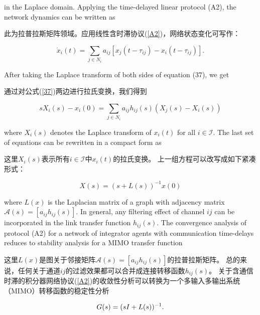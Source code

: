 \documentclass{article}
\begin{document}
{\color[gray]{0.5}
\noindent in the Laplace domain. 
Applying the time-delayed linear protocol (A2), the network dynamics can be written as
}

\noindent 此为拉普拉斯矩阵领域。应用线性含时滞协议(\ref{A2})，网络状态变化可写作：

\begin{equation}
    \dot{x}_i(t) = \sum_{j\in N_i} a_{ij} [x_j(t-\tau_{ij}) - x_i(t-\tau_{ij})].
    \tag{37}
    \label{37}
\end{equation}

{\color[gray]{0.5}
\noindent After taking the Laplace transform of both sides of equation (37), we get 
}

\noindent 通过对公式(\ref{37})两边进行拉氏变换，我们得到

\begin{equation}
    sX_i(s) - x_i(0) = \sum_{j\in N_i} a_{ij} h_{ij}(s) (X_j(s) - X_i(s))
    \tag{38}
    \label{38}
\end{equation}

{\color[gray]{0.5}
\noindent where $X_i(s)$ denotes the Laplace transform of $x_i(t)$ for all $i\in \mathcal{I}$. 
The last set of equations can be rewritten in a compact form as
}

\noindent 这里$X_i(s)$表示所有$i\in \mathcal{I}$中$x_i(t)$的拉氏变换。
上一组方程可以改写成如下紧凑形式：

\begin{equation}
    X(s) = (s+L(s))^{-1}x(0)
    \tag{39}
    \label{39}
\end{equation}

{\color[gray]{0.5}
\noindent where $L(x)$ is the Laplacian matrix of a graph with adjacency matrix $\mathcal{A}(s) = [a_{ij}h_{ij}(s)]$. 
In general, any filtering effect of channel $ij$ can be incorporated in the link transfer function $h_{ij}(s)$. 
The convergence analysis of protocol (A2) for a network of integrator agents with communication time-delays reduces to stability analysis for a MIMO transfer function 
}

\noindent 这里$L(x)$是图关于邻接矩阵$\mathcal{A}(s) = [a_{ij}h_{ij}(s)]$的拉普拉斯矩阵。
总的来说，任何关于通道$ij$的过滤效果都可以合并成连接转移函数$h_{ij}(s)$。
关于含通信时滞的积分器网络协议(\ref{A2})的收敛性分析可以转换为一个多输入多输出系统（MIMO）转移函数的稳定性分析

\begin{equation}
    G(s) = (sI+L(s))^{-1}.
    \notag
\end{equation}
\end{document}
